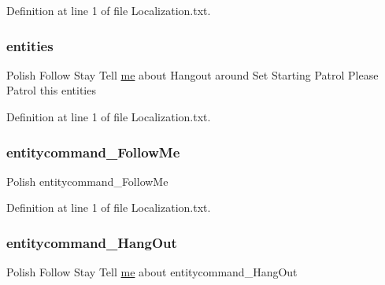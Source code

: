 Definition at line 1 of file Localization.\+txt.

\mbox{\label{_blooms_01_animal_01_husbandry_2_config_2_localization_8txt_af2c5d8ef92d9813da6e6610532caf7c1}} 
\subsubsection{\texorpdfstring{entities}{entities}}
{\footnotesize\ttfamily Polish Follow Stay Tell \mbox{\hyperlink{_blooms_01_animal_01_husbandry_2_config_2_localization_8txt_a290fbecf7c016b09bc675718400d6fca}{me}} about Hangout around Set Starting Patrol Please Patrol this entities}



Definition at line 1 of file Localization.\+txt.

\mbox{\label{_blooms_01_animal_01_husbandry_2_config_2_localization_8txt_a2613e5dfe3a2702fc9e8d599b1590ef5}} 
\subsubsection{\texorpdfstring{entitycommand\_FollowMe}{entitycommand\_FollowMe}}
{\footnotesize\ttfamily Polish entitycommand\+\_\+\+Follow\+Me}



Definition at line 1 of file Localization.\+txt.

\mbox{\label{_blooms_01_animal_01_husbandry_2_config_2_localization_8txt_ac56b48dfdc12eb33d564ae3192862fe8}} 
\subsubsection{\texorpdfstring{entitycommand\_HangOut}{entitycommand\_HangOut}}
{\footnotesize\ttfamily Polish Follow Stay Tell \mbox{\hyperlink{_blooms_01_animal_01_husbandry_2_config_2_localization_8txt_a290fbecf7c016b09bc675718400d6fca}{me}} about entitycommand\+\_\+\+Hang\+Out}



